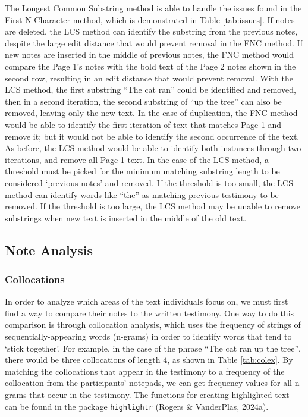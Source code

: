 \documentclass[print]{nuthesis}
\begin{document}
The Longest Common Substring method is able to handle the issues found in the First N Character method, which is demonstrated in Table \ref{tab:issues}.
If notes are deleted, the LCS method can identify the substring from the previous notes, despite the large edit distance that would prevent removal in the FNC method.
If new notes are inserted in the middle of previous notes, the FNC method would compare the Page 1's notes with the bold text of the Page 2 notes shown in the second row, resulting in an edit distance that would prevent removal.
With the LCS method, the first substring ``The cat ran'' could be identified and removed, then in a second iteration, the second substring of ``up the tree'' can also be removed, leaving only the new text.
In the case of duplication, the FNC method would be able to identify the first iteration of text that matches Page 1 and remove it; but it would not be able to identify the second occurrence of the text.
As before, the LCS method would be able to identify both instances through two iterations, and remove all Page 1 text.
In the case of the LCS method, a threshold must be picked for the minimum matching substring length to be considered `previous notes' and removed.
If the threshold is too small, the LCS method can identify words like ``the'' as matching previous testimony to be removed.
If the threshold is too large, the LCS method may be unable to remove substrings when new text is inserted in the middle of the old text.

\hypertarget{note-analysis}{%
\subsection{Note Analysis}\label{note-analysis}}

\hypertarget{collocations}{%
\subsubsection{Collocations}\label{collocations}}

In order to analyze which areas of the text individuals focus on, we must first find a way to compare their notes to the written testimony.
One way to do this comparison is through collocation analysis, which uses the frequency of strings of sequentially-appearing words (n-grams) in order to identify words that tend to `stick together'.
For example, in the case of the phrase ``The cat ran up the tree'', there would be three collocations of length 4, as shown in Table \ref{tab:colex}.
By matching the collocations that appear in the testimony to a frequency of the collocation from the participants' notepads, we can get frequency values for all n-grams that occur in the testimony.
The functions for creating highlighted text can be found in the package \texttt{highlightr} (Rogers \& VanderPlas, 2024a).
\end{document}

